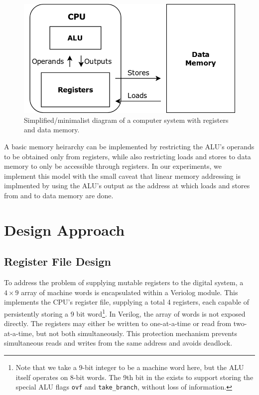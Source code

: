 \documentclass[12pt, letterpaper]{article}
\begin{document}
\begin{figure}[h]
\centering
\includegraphics[width=.7\linewidth]{images/simple-stateful-cpu.png}
\caption{Simplified/minimalist diagram of a computer system with registers and data memory.}
\end{figure}

A basic memory heirarchy can be implemented by restricting the ALU's operands to be obtained only from registers, while also restricting loads and stores to data memory to only be accessible through registers.  In our experiments, we implement this model with the small caveat that linear memory addressing is implmented by using the ALU's output as the address at which loads and stores from and to data memory are done.



\newpage
\section{Design Approach}
\subsection{Register File Design}
To address the problem of supplying mutable registers to the digital system, a $4 \times 9$ array of machine words is encapsulated within a Veriolog module.  This implements the CPU's register file, supplying a total 4 registers, each capable of persistently storing a 9 bit word\footnote{Note that we take a 9-bit integer to be a machine word here, but the ALU itself operates on 8-bit words.  The 9th bit in the exists to support storing the special ALU flags \texttt{ovf} and \texttt{take\_branch}, without loss of information.}.  In Verilog, the array of words is not exposed directly.  The registers may either be written to one-at-a-time or read from two-at-a-time, but not both simultaneously.  This protection mechanism prevents simultaneous reads and writes from the same address and avoids deadlock.  
\end{document}
